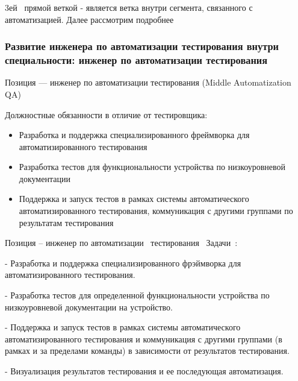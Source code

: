\documentclass{../industrial-development}
\begin{document}
\lecturenotes

 3ей~\cite{mc} прямой веткой  - является ветка внутри сегмента, связанного с автоматизацией. Далее рассмотрим подробнее

\begin{frame} \frametitle{Развитие инженера по автоматизации тестирования внутри специальности: инженер по автоматизации тестирования }
 \begin{block}{}
  \alert{Позиция ---  инженер по автоматизации тестирования (Middle Automatization QA)}

Должностные обязанности в отличие от тестировщика: 
  \end{block}
  \begin{itemize}
  \item Разработка и поддержка специализированного фреймворка для автоматизированного тестирования
  \item  Разработка тестов для функциональности устройства по низкоуровневой документации 
  \item Поддержка и запуск тестов в рамках системы автоматического автоматизированного тестирования, коммуникация с другими группами по результатам тестирования
  \end{itemize}
\end{frame}

\lecturenotes

Позиция – инженер по автоматизации~\cite{hh} тестирования~\cite{itcf}
Задачи~\cite{rab}:

- Разработка и поддержка специализированного фрэймворка для автоматизированного тестирования.

- Разработка тестов для определенной функциональности устройства по низкоуровневой документации на устройство.

- Поддержка и запуск тестов в рамках системы автоматического автоматизированного тестирования и коммуникация с другими группами (в рамках и за пределами команды) в зависимости от результатов тестирования.

- Визуализация результатов тестирования и ее последующая автоматизация.
\end{document}
